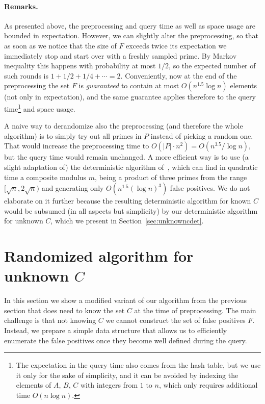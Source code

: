 \documentclass[10pt,a4paper]{article}
\begin{document}
\paragraph{Remarks.}
As presented above, the preprocessing and query time as well as space usage are bounded in expectation. However, we can slightly alter the preprocessing, so that as soon as we notice that the size of $F$ exceeds twice its expectation we immediately stop and start over with a freshly sampled prime. By Markov inequality this happens with probability at most $1/2$, so the expected number of such rounds is $1+1/2+1/4+\cdots=2$. Conveniently, now at the end of the preprocessing the set $F$ is \emph{guaranteed} to contain at most $O(n^{1.5} \log n)$ elements (not only in expectation), and the same guarantee applies therefore to the query time\footnote{The expectation in the query time also comes from the hash table, but we use it only for the sake of simplicity, and it can be avoided by indexing the elements of $A$, $B$, $C$ with integers from $1$ to $n$, which only requires additional time $O(n \log n)$.} and space usage.

A naive way to derandomize also the preprocessing (and therefore the whole algorithm) is to simply try out all primes in $P$ instead of picking a random one. That would increase the preprocessing time to $O(|P| \cdot n^2) = O(n^{3.5}/\log n)$, but the query time would remain unchanged.
A more efficient way is to use (a slight adaptation of) the deterministic algorithm of~\cite[Lemma~11]{FischerK024}, which can find in quadratic time a composite modulus $m$, being a product of three primes from the range $[\sqrt{n}, 2\sqrt{n})$ and generating only $O(n^{1.5} (\log n)^3)$ false positives. We do not elaborate on it further because the resulting deterministic algorithm for known $C$ would be subsumed (in all aspects but simplicity) by our deterministic algorithm for unknown $C$, which we present in Section~\ref{sec:unknowncdet}.    
    
\section{Randomized algorithm for unknown \texorpdfstring{$C$}{C}}
\label{sec:unknowncrnd}

In this section we show a modified variant of our algorithm from the previous section that does need to know the set $C$ at the time of preprocessing. The main challenge is that not knowing $C$ we cannot construct the set of false positives $F$. Instead, we prepare a simple data structure that allows us to efficiently enumerate the false positives once they become well defined during the query.
\end{document}
